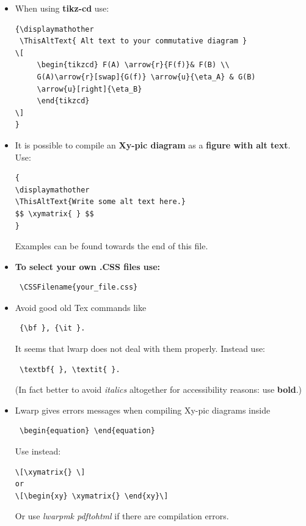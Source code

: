 \documentclass[a4paper,12pt]{article}
\newtheorem{Fundamental Theorem}{Fundamental Theorem}
\begin{document}
\begin{itemize}
\begin{verbatim}
\end{tikzpicture}
\end{figure}
\end{verbatim}
or
\begin{verbatim}
\begin{center}\ThisAltText{Alt text to your diagram}
\begin{tikzpicture}

\end{tikzpicture}
\end{center}
\end{verbatim}

Examples  can be found towards the end of this file.
\item When using \textbf{tikz-cd} use:
\begin{verbatim}
{\displaymathother
 \ThisAltText{ Alt text to your commutative diagram }
\[
     \begin{tikzcd} F(A) \arrow{r}{F(f)}& F(B) \\
     G(A)\arrow{r}[swap]{G(f)} \arrow{u}{\eta_A} & G(B)
     \arrow{u}[right]{\eta_B}
     \end{tikzcd}
\]
} 
\end{verbatim}
 


\item It is possible to compile an \textbf{Xy-pic diagram} as a \textbf{figure with alt text}. Use:
\begin{verbatim}
{
\displaymathother
\ThisAltText{Write some alt text here.}
$$ \xymatrix{ } $$
}
\end{verbatim}
  Examples  can be found towards the end of this file.


\item \textbf{To select your own  .CSS files use:}
\begin{verbatim}
 \CSSFilename{your_file.css}
\end{verbatim}

\item  Avoid good old Tex commands like 
\begin{verbatim} {\bf }, {\it }.\end{verbatim}

It seems that lwarp does not deal with them properly. Instead use: 
\begin{verbatim} \textbf{ }, \textit{ }.\end{verbatim}
(In fact better to avoid \textit{italics} altogether for accessibility reasons: use \textbf{bold}.) 
\item Lwarp  gives  errors messages when compiling  Xy-pic diagrams  inside
\begin{verbatim} \begin{equation} \end{equation}\end{verbatim}
Use instead:
\begin{verbatim}
\[\xymatrix{} \]
or
\[\begin{xy} \xymatrix{} \end{xy}\]
\end{verbatim}
Or use \emph{lwarpmk pdftohtml} if there are compilation errors.


\end{itemize}
\end{document}
